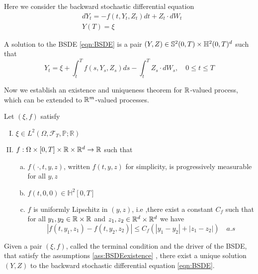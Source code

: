 Here we consider the backward stochastic differential equation 
\begin{equation}
	\label{eqn:BSDE}
	\begin{split}
		&dY_t=-f(t,Y_t,Z_t)dt+Z_t\cdot dW_t\\
		&Y(T)=\xi
	\end{split}
\end{equation}
\begin{definition}
	A solution to the BSDE \eqref{eqn:BSDE} is a pair $(Y,Z)\in \mathbb{S}^2(0,T) \times \mathbb{H}^2(0,T)^d$ such that
	\begin{equation}
	Y_t=\xi+\int_t^T f\left(s, Y_s, Z_s\right) d s-\int_t^T Z_s \cdot d W_s, \quad 0 \leq t \leq T
	\end{equation}
\end{definition}
Now we establish an existence and uniqueness theorem for $\mathbb{R}$-valued process, which can be extended to $\mathbb{R}^m$-valued processes. 
\begin{assumptions}
	\label{ass:BSDEexistence}
	Let $(\xi,f)$ satisfy
	\begin{enumerate}[I.]
		\item $\xi \in L^2(\Omega,\mathcal{F}_T,\mathbb{P};\mathbb{R})$
		\item $f:\Omega\times [0,T]\times\mathbb{R}\times\mathbb{R}^d\to \mathbb{R}$ such that \begin{enumerate}[a)]
			\item $f(\cdot,t,y,z)$, written $f(t,y,z)$ for simplicity, is progressively measurable for all $y,z$
			\item $f(t,0,0)\in \mathbb{H}^2[0,T]$ 
			\item $f$ is uniformly Lipschitz in $(y,z)$, i.e ,there exist a constant $C_f$ such that for all $y_1,y_2\in \mathbb{R}\times \mathbb{R} $ and $z_1,z_2\in \mathbb{R}^d\times\mathbb{R}^d$ we have
			\begin{equation}
				\label{eqn:lipschitz}
				\left|f\left(t, y_1, z_1\right)-f\left(t, y_2, z_2\right)\right| \leq C_f\left(\left|y_1-y_2\right|+\left|z_1-z_2\right|\right) \quad a.s
			\end{equation}
		\end{enumerate}
	\end{enumerate}
\end{assumptions}
\begin{theorem}
	\label{thm:existence}
Given a pair $(\xi,f)$, called the terminal condition and the driver of the BSDE, that satisfy the assumptions \ref{ass:BSDEexistence}
, there exist a unique solution $(Y,Z)$ to the backward stochastic differential equation \eqref{eqn:BSDE}.
\end{theorem}
